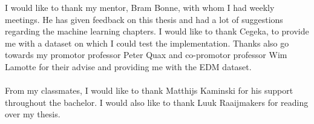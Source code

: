 \documentclass[
10pt, %
twoside, %
english, %
singlespacing, %
headsepline, %
]{BachelorThesis} %
\begin{document}

\begin{acknowledgements}
\addchaptertocentry{\acknowledgementname} %

\noindent I would like to thank my mentor, Bram Bonne, with whom I had weekly meetings. He has given feedback on this thesis and had a lot of suggestions regarding the machine learning chapters. I would like to thank Cegeka, to provide me with a dataset on which I could test the implementation. Thanks also go towards my promotor professor Peter Quax and co-promotor professor Wim Lamotte for their advise and providing me with the EDM dataset. \\
\\
From my classmates, I would like to thank Matthijs Kaminski for his support throughout the bachelor. I would also like to thank Luuk Raaijmakers for reading over my thesis.

\end{acknowledgements}

\end{document}

